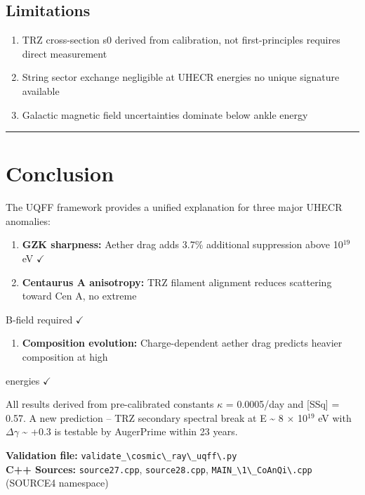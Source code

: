 \documentclass[12pt,a4paper]{article}
\begin{document}
\subsection{Limitations}

\begin{enumerate}
  \item TRZ cross-section s0 derived from calibration, not first-principles  requires direct measurement
  \item String sector exchange negligible at UHECR energies  no unique signature available
  \item Galactic magnetic field uncertainties dominate below ankle energy
\end{enumerate}

\medskip\hrule\medskip

\section{Conclusion}

The UQFF framework provides a unified explanation for three major UHECR anomalies:

\begin{enumerate}
  \item \textbf{GZK sharpness:} Aether drag adds 3.7\% additional suppression above 10$^{19}$ eV $\checkmark$
  \item \textbf{Centaurus A anisotropy:} TRZ filament alignment reduces scattering toward Cen A, no extreme
\end{enumerate}

B-field required $\checkmark$

\begin{enumerate}
  \item \textbf{Composition evolution:} Charge-dependent aether drag predicts heavier composition at high
\end{enumerate}

energies $\checkmark$

All results derived from pre-calibrated constants $\kappa$ = 0.0005/day and [SSq] = 0.57. A new prediction -- TRZ secondary spectral break at E \textasciitilde{} 8 $\times$ 10$^{19}$ eV with $\Delta\gamma$ \textasciitilde{} +0.3 is testable by AugerPrime within 23 years.

\begin{flushleft}
\textbf{Validation file:} \texttt{validate\_\textbackslash {cosmic\textbackslash \_ray\textbackslash \_uqff\textbackslash }.py} \\
\textbf{C++ Sources:} \texttt{source27.cpp}, \texttt{source28.cpp}, \texttt{MAIN\_\textbackslash {1\textbackslash \_CoAnQi\textbackslash }.cpp} (SOURCE4 namespace) \\
\end{flushleft}
\end{document}
